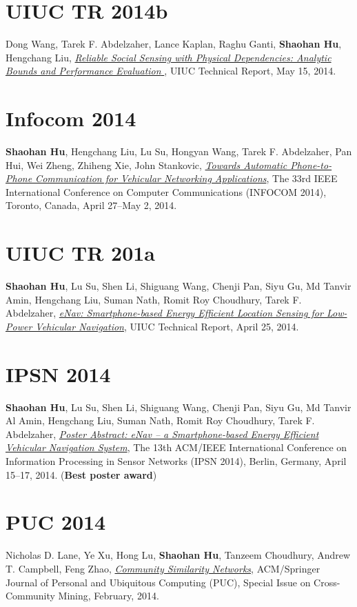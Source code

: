 \section{\sc UIUC TR 2014b}\hypertarget{wang2014uiuc}{} Dong Wang, Tarek F. Abdelzaher, Lance Kaplan, Raghu Ganti, \textbf{Shaohan Hu}, Hengchang Liu, \href{https://www.ideals.illinois.edu/handle/2142/49113}{\emph{Reliable Social Sensing with Physical Dependencies: Analytic Bounds and Performance Evaluation }}, \textsf{UIUC Technical Report}, May 15, 2014.

\section{\sc Infocom 2014}\hypertarget{hu2014infocom}{} \textbf{Shaohan Hu}, Hengchang Liu, Lu Su, Hongyan Wang, Tarek F. Abdelzaher, Pan Hui, Wei Zheng, Zhiheng Xie, John Stankovic, \href{http://ieeexplore.ieee.org/xpl/articleDetails.jsp?arnumber=6848113}{\emph{Towards Automatic Phone-to-Phone Communication for Vehicular Networking Applications}}, \textsf{The 33rd IEEE International Conference on Computer Communications (INFOCOM 2014)}, Toronto, Canada, April 27--May 2, 2014.

\section{\sc UIUC TR 201a }\hypertarget{hu2014uiuc1}{} \textbf{Shaohan Hu}, Lu Su, Shen Li, Shiguang Wang, Chenji Pan, Siyu Gu, Md Tanvir Amin, Hengchang Liu, Suman Nath, Romit Roy Choudhury, Tarek F. Abdelzaher, \href{https://www.ideals.illinois.edu/handle/2142/48917}{\emph{eNav: Smartphone-based Energy Efficient Location Sensing for Low-Power Vehicular Navigation}}, \textsf{UIUC Technical Report}, April 25, 2014.

\section{\sc IPSN 2014}\hypertarget{hu2014ipsn}{} \textbf{Shaohan Hu}, Lu Su, Shen Li, Shiguang Wang, Chenji Pan, Siyu Gu, Md Tanvir Al Amin, Hengchang Liu, Suman Nath, Romit Roy Choudhury, Tarek F. Abdelzaher, \href{http://dl.acm.org/citation.cfm?id=2602374}{\emph{Poster Abstract: eNav -- a Smartphone-based Energy Efficient Vehicular Navigation System}}, \textsf{The 13th ACM/IEEE International Conference on Information Processing in Sensor Networks (IPSN 2014)}, Berlin, Germany, April 15--17, 2014. (\textbf{Best poster award})

\section{\sc PUC 2014}\hypertarget{lane2013puc}{} Nicholas D. Lane, Ye Xu, Hong Lu, \textbf{Shaohan Hu}, Tanzeem Choudhury, Andrew T. Campbell, Feng Zhao, \href{http://link.springer.com/article/10.1007/s00779-013-0655-1}{\emph{Community Similarity Networks}}, \textsf{ACM/Springer Journal of Personal and Ubiquitous Computing (PUC), Special Issue on Cross-Community Mining}, February, 2014.

